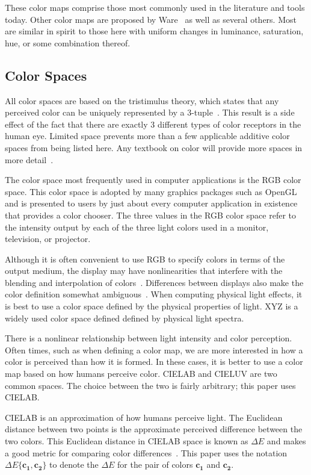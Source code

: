 \documentclass{vgtc}                          %
\newcommand{\lcite}[1]{~\cite{#1}}
\newcommand{\scite}[1]{~\cite{#1}}
\newcommand{\RGB}{RGB\xspace}
\newcommand{\XYZ}{XYZ\xspace}
\newcommand{\Lab}{CIELAB\xspace}
\newcommand{\Luv}{CIELUV\xspace}
\newcommand{\DeltaE}{\ensuremath{\Delta{}E}\xspace}
\newcommand*{\cvec}[1]{\mathbf{#1}}
\begin{document}
These color maps comprise those most commonly used in the literature and tools
today.  Other color maps are proposed by Ware\scite{Ware04} as well as
several others.  Most are similar in spirit to those here with uniform
changes in luminance, saturation, hue, or some combination thereof.

\subsection{Color Spaces}
\label{sec:PreviousWork:ColorSpaces}

All color spaces are based on the tristimulus theory, which states that any
perceived color can be uniquely represented by a
3-tuple\lcite{Feynman63,Stone05,Wyszecki82}.  This result is a side effect
of the fact that there are exactly 3 different types of color receptors in
the human eye.  Limited space prevents more than a few applicable additive
color spaces from being listed here.  Any textbook on color will provide
more spaces in more detail\lcite{Stone03,Wyszecki82}.

The color space most frequently used in computer applications is the \RGB
color space.  This color space is adopted by many graphics packages such as
OpenGL and is presented to users by just about every computer application
in existence that provides a color chooser.  The three values in the \RGB
color space refer to the intensity output by each of the three light colors
used in a monitor, television, or projector.

Although it is often convenient to use \RGB to specify colors in terms of
the output medium, the display may have nonlinearities that interfere with
the blending and interpolation of colors\lcite{Stone03}.  Differences
between displays also make the color definition somewhat
ambiguous\lcite{Fortner97}.  When computing physical light effects, it is
best to use a color space defined by the physical properties of light.
\XYZ is a widely used color space defined defined by physical light
spectra.

There is a nonlinear relationship between light intensity and color
perception.  Often times, such as when defining a color map, we are more
interested in how a color is perceived than how it is formed.  In these
cases, it is better to use a color map based on how humans perceive color.
\Lab and \Luv are two common spaces.  The choice between the two is fairly
arbitrary; this paper uses \Lab.

\Lab is an approximation of how humans perceive light.  The Euclidean
distance between two points is the approximate perceived difference between
the two colors.  This Euclidean distance in \Lab space is known as \DeltaE
and makes a good metric for comparing color differences\lcite{Wyszecki82}.
This paper uses the notation $\DeltaE\{\cvec{c_1},\cvec{c_2}\}$ to denote
the \DeltaE for the pair of colors $\cvec{c_1}$ and $\cvec{c_2}$.
\end{document}
